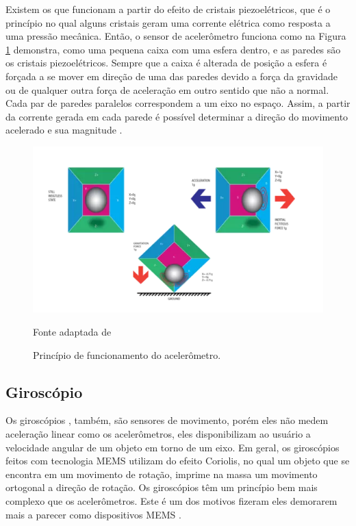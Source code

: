 				Existem os que funcionam a partir do efeito de cristais piezoelétricos, que é o princípio no qual alguns cristais geram uma corrente elétrica como resposta a uma pressão mecânica. Então, o sensor de acelerômetro  funciona como na Figura \ref{acel} demonstra, como uma pequena caixa com uma esfera dentro, e as paredes são os cristais piezoelétricos.  Sempre que a caixa é alterada de posição a esfera é forçada a se mover em direção de uma das paredes devido a força da gravidade ou de qualquer outra força de aceleração em outro sentido que não a normal. Cada par de paredes paralelos correspondem a um eixo no espaço. Assim, a partir da corrente gerada em cada parede é possível determinar a direção do movimento acelerado e sua magnitude \cite{Sanjeev2018}.
				
				\begin{figure}[h]
					\centering
					\includegraphics[keepaspectratio=true,scale=0.8
					]{figuras/acelerometro.PNG}
					\caption{Princípio de funcionamento do acelerômetro.}
					Fonte adaptada de \cite{Sanjeev2018}
					\label{acel}
				\end{figure}
	
		\subsection{Giroscópio}
			
			Os giroscópios , também, são sensores de movimento, porém eles não medem aceleração linear como os acelerômetros, eles disponibilizam ao usuário a velocidade angular de um objeto em torno de um eixo. Em geral, os giroscópios feitos com tecnologia MEMS utilizam do efeito Coriolis, no qual um objeto que se encontra em um movimento de rotação, imprime na massa um movimento ortogonal a direção de rotação. Os giroscópios têm um princípio bem mais complexo que os acelerômetros. Este é um dos motivos fizeram eles demorarem mais a parecer como dispositivos MEMS \cite{almeida2014}.
			
